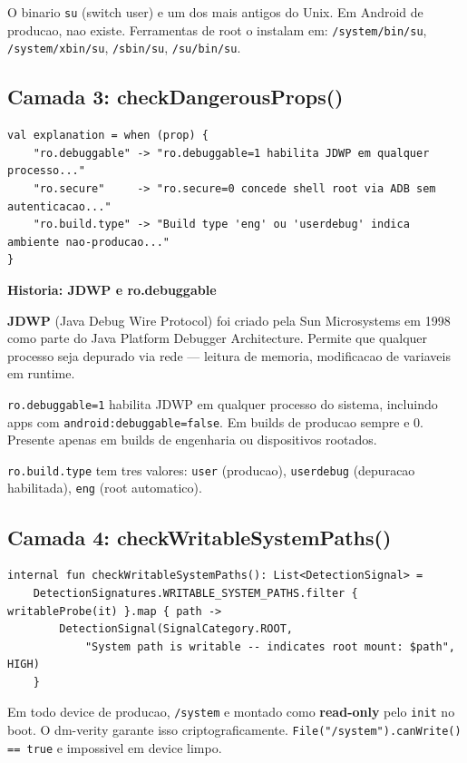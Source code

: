 \documentclass[12pt,a4paper]{article}
\begin{document}
O binario \texttt{su} (switch user) e um dos mais antigos do Unix.
Em Android de producao, nao existe. Ferramentas de root o instalam em:
\texttt{/system/bin/su}, \texttt{/system/xbin/su}, \texttt{/sbin/su}, \texttt{/su/bin/su}.

\subsection{Camada 3: checkDangerousProps()}

\begin{lstlisting}
val explanation = when (prop) {
    "ro.debuggable" -> "ro.debuggable=1 habilita JDWP em qualquer processo..."
    "ro.secure"     -> "ro.secure=0 concede shell root via ADB sem autenticacao..."
    "ro.build.type" -> "Build type 'eng' ou 'userdebug' indica ambiente nao-producao..."
}
\end{lstlisting}

\begin{historybox}
\textbf{Historia: JDWP e ro.debuggable}

\textbf{JDWP} (Java Debug Wire Protocol) foi criado pela Sun Microsystems em 1998
como parte do Java Platform Debugger Architecture. Permite que qualquer processo
seja depurado via rede --- leitura de memoria, modificacao de variaveis em runtime.

\texttt{ro.debuggable=1} habilita JDWP em qualquer processo do sistema,
incluindo apps com \texttt{android:debuggable=false}. Em builds de producao sempre
e 0. Presente apenas em builds de engenharia ou dispositivos rootados.

\texttt{ro.build.type} tem tres valores:
\texttt{user} (producao), \texttt{userdebug} (depuracao habilitada), \texttt{eng} (root automatico).
\end{historybox}

\subsection{Camada 4: checkWritableSystemPaths()}

\begin{lstlisting}
internal fun checkWritableSystemPaths(): List<DetectionSignal> =
    DetectionSignatures.WRITABLE_SYSTEM_PATHS.filter { writableProbe(it) }.map { path ->
        DetectionSignal(SignalCategory.ROOT,
            "System path is writable -- indicates root mount: $path", HIGH)
    }
\end{lstlisting}

Em todo device de producao, \texttt{/system} e montado como \textbf{read-only}
pelo \texttt{init} no boot. O dm-verity garante isso criptograficamente.
\texttt{File("/system").canWrite() == true} e impossivel em device limpo.
\end{document}
